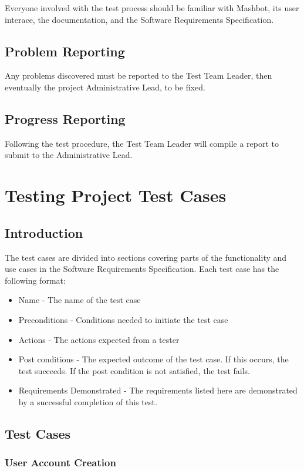 \documentclass{article}
\begin{document}
Everyone involved with the test process should be familiar with Mashbot, its
user interace, the documentation, and the Software Requirements Specification.

\subsection{Problem Reporting}

Any problems discovered must be reported to the Test Team Leader, then
eventually the project Administrative Lead, to be fixed.

\subsection{Progress Reporting}

Following the test procedure, the Test Team Leader will compile a report to
submit to the Administrative Lead.

\section{Testing Project Test Cases}

\subsection{Introduction} %
	The test cases are divided into sections covering parts of the functionality and use cases in the Software Requirements Specification. Each test case has the following format:
	\begin{itemize}
	  \item Name - The name of the test case
	  \item Preconditions - Conditions needed to initiate the test case
	  \item Actions - The actions expected from a tester
		\item Post conditions - The expected outcome of the test
            case. If this occurs, the test succeeds. If the post
            condition is not satisfied, the test fails.
		\item Requirements Demonstrated - The requirements listed here are 
		demonstrated by a successful completion of this test.
	\end{itemize}

\subsection{Test Cases}
\subsubsection{User Account Creation} %
\end{document}
